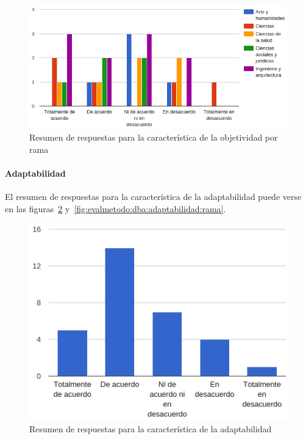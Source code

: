 \begin{figure}[h]
  \begin{center}
    \includegraphics[scale=0.45]{C_DBA_objetividad_rama.png}
  \end{center}
  \caption{Resumen de respuestas para la característica de la objetividad por rama}
  \label{fig:evalmetodo:dba:objetividad:rama}
\end{figure}

\newpage
\paragraph*{Adaptabilidad}

El resumen de respuestas para la característica de la adaptabilidad puede verse en las figuras~\ref{fig:evalmetodo:dba:adaptabilidad} y~\ref{fig:evalmetodo:dba:adaptabilidad:rama}.

\begin{figure}[h]
  \begin{center}
    \includegraphics[scale=0.45]{C_DBA_adaptabilidad.png}
  \end{center}
  \caption{Resumen de respuestas para la característica de la adaptabilidad}
  \label{fig:evalmetodo:dba:adaptabilidad}
\end{figure}

